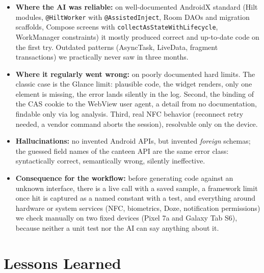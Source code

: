 \documentclass{msereport}
\begin{document}
\begin{itemize}
  \item \textbf{Where the AI was reliable:} on well-documented
        AndroidX standard (Hilt modules, \texttt{@HiltWorker} with
        \texttt{@AssistedInject}, Room DAOs and migration scaffolds,
        Compose screens with \texttt{collectAsStateWithLifecycle},
        WorkManager constraints) it mostly produced correct and up-to-date code
        on the first try. Outdated patterns (AsyncTask, LiveData, fragment
        transactions) we practically never saw in three months.
  \item \textbf{Where it regularly went wrong:} on poorly documented
        hard limits. The classic case is the Glance limit: plausible code, the
        widget renders, only one element is missing, the error lands silently
        in the log. Second, the binding of the CAS cookie to the WebView user
        agent, a detail from no documentation, findable only via log analysis.
        Third, real NFC behavior (reconnect retry needed, a vendor command
        aborts the session), resolvable only on the device.
  \item \textbf{Hallucinations:} no invented Android APIs, but invented
        \emph{foreign} schemas; the guessed field names of the canteen API are
        the same error class: syntactically correct, semantically wrong,
        silently ineffective.
  \item \textbf{Consequence for the workflow:} before generating code against an
        unknown interface, there is a live call with a saved sample, a
        framework limit once hit is captured as a named constant with a
        test, and everything around hardware or system services (NFC,
        biometrics, Doze, notification permissions) we check manually on two
        fixed devices (Pixel 7a and Galaxy Tab S6), because neither a unit test
        nor the AI can say anything about it.
\end{itemize}

\msegap

\section{Lessons Learned}
\end{document}
